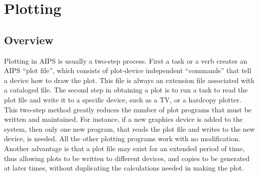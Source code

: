 \setcounter{chapter}{10} %
\chapter{Plotting}
\setcounter{page}{1}
\section{Overview}
Plotting in AIPS is usually a two-step process.  First a task or a
verb creates an AIPS ``plot file'', which consists of plot-device
independent ``commands'' that tell a device how to draw the plot.
This file is always an extension file associated with a cataloged
file. The second step in obtaining a plot is to
run a task to read the plot file and write it to a specific device,
such as a TV, or a hardcopy plotter.  This two-step method greatly
reduces the number of plot programs that must be written and
maintained.  For instance, if a new graphics device is added to the
system, then only one new program, that reads the plot file and writes
to the new device, is needed. All the other plotting programs work
with no modification.   Another advantage is that a plot file may
exist for an extended period of time, thus allowing plots to be
written to different devices, and copies to be generated at later
times, without duplicating the calculations needed in making the plot.

